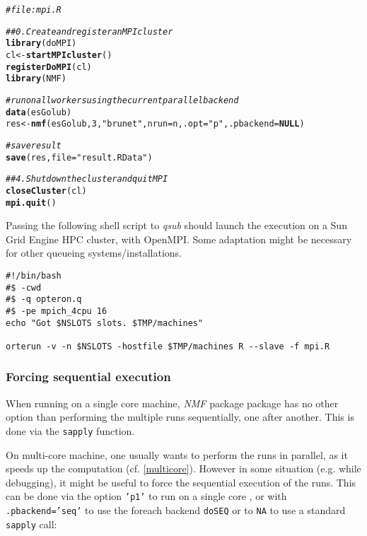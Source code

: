 \documentclass[a4paper]{article}\usepackage[]{graphicx}\usepackage[]{color}
\makeatletter
\newcommand{\hlnum}[1]{\textcolor[rgb]{0.686,0.059,0.569}{#1}}%
\newcommand{\hlstr}[1]{\textcolor[rgb]{0.192,0.494,0.8}{#1}}%
\newcommand{\hlcom}[1]{\textcolor[rgb]{0.678,0.584,0.686}{\textit{#1}}}%
\newcommand{\hlstd}[1]{\textcolor[rgb]{0.345,0.345,0.345}{#1}}%
\newcommand{\hlkwa}[1]{\textcolor[rgb]{0.161,0.373,0.58}{\textbf{#1}}}%
\newcommand{\hlkwb}[1]{\textcolor[rgb]{0.69,0.353,0.396}{#1}}%
\newcommand{\hlkwc}[1]{\textcolor[rgb]{0.333,0.667,0.333}{#1}}%
\newcommand{\hlkwd}[1]{\textcolor[rgb]{0.737,0.353,0.396}{\textbf{#1}}}%
\newenvironment{kframe}{%
 \def\at@end@of@kframe{}%
 \ifinner\ifhmode%
  \def\at@end@of@kframe{\end{minipage}}%
  \begin{minipage}{\columnwidth}%
 \fi\fi%
 \def\FrameCommand##1{\hskip\@totalleftmargin \hskip-\fboxsep
 \colorbox{shadecolor}{##1}\hskip-\fboxsep
     \hskip-\linewidth \hskip-\@totalleftmargin \hskip\columnwidth}%
 \MakeFramed {\advance\hsize-\width
   \@totalleftmargin\z@ \linewidth\hsize
   \@setminipage}}%
 {\par\unskip\endMakeFramed%
 \at@end@of@kframe}
\newenvironment{knitrout}{}{} %
\let\code=\texttt
\newcommand{\pkgname}[1]{\textit{#1}\xspace}
\newcommand{\Rpkg}[1]{\pkgname{#1} package\xspace}
\newcommand{\nmfpack}{\Rpkg{NMF}}
\makeatother
\begin{document}
\begin{knitrout}
\color{fgcolor}\begin{kframe}
\begin{alltt}
\hlcom{# file: mpi.R}

\hlcom{## 0. Create and register an MPI cluster}
\hlkwd{library}\hlstd{(doMPI)}
\hlstd{cl} \hlkwb{<-} \hlkwd{startMPIcluster}\hlstd{()}
\hlkwd{registerDoMPI}\hlstd{(cl)}
\hlkwd{library}\hlstd{(NMF)}

\hlcom{# run on all workers using the current parallel backend}
\hlkwd{data}\hlstd{(esGolub)}
\hlstd{res} \hlkwb{<-} \hlkwd{nmf}\hlstd{(esGolub,} \hlnum{3}\hlstd{,} \hlstr{"brunet"}\hlstd{,} \hlkwc{nrun} \hlstd{= n,} \hlkwc{.opt} \hlstd{=} \hlstr{"p"}\hlstd{,} \hlkwc{.pbackend} \hlstd{=} \hlkwa{NULL}\hlstd{)}

\hlcom{# save result}
\hlkwd{save}\hlstd{(res,} \hlkwc{file} \hlstd{=} \hlstr{"result.RData"}\hlstd{)}

\hlcom{## 4. Shutdown the cluster and quit MPI}
\hlkwd{closeCluster}\hlstd{(cl)}
\hlkwd{mpi.quit}\hlstd{()}
\end{alltt}
\end{kframe}
\end{knitrout}


Passing the following shell script to \emph{qsub} should launch the execution on a Sun Grid Engine HPC cluster, with OpenMPI.
Some adaptation might be necessary for other queueing systems/installations.

\begin{shaded}
\small
\begin{verbatim}
#!/bin/bash
#$ -cwd 
#$ -q opteron.q
#$ -pe mpich_4cpu 16
echo "Got $NSLOTS slots. $TMP/machines"

orterun -v -n $NSLOTS -hostfile $TMP/machines R --slave -f mpi.R
\end{verbatim}
\end{shaded}

\subsubsection{Forcing sequential execution}
When running on a single core machine, \nmfpack package has no other option than performing the multiple runs sequentially, one after another. 
This is done via the \code{sapply} function.

On multi-core machine, one usually wants to perform the runs in parallel, as it speeds up the computation (cf. \cref{multicore}).
However in some situation (e.g. while debugging), it might be useful to force the sequential execution of the runs. 
This can be done via the option \code{'p1'} to run on a single core , or with
\code{.pbackend='seq'} to use the foreach backend \code{doSEQ} or to \code{NA} to use a standard \code{sapply} call:
\end{document}
